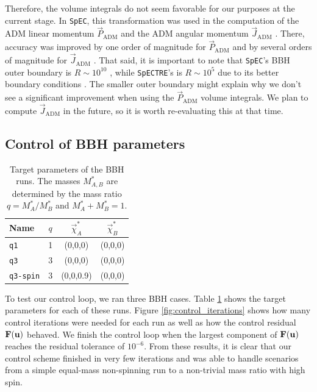 \documentclass{../document}
\begin{document}
      Therefore, the volume integrals do not seem favorable for our purposes at the current stage. In {\tt SpEC}, this transformation was used in the computation of the ADM linear momentum $\vec P_\text{ADM}$ and the ADM angular momentum $\vec J_\text{ADM}$ \cite{Serguei}. There, accuracy was improved by one order of magnitude for $\vec P_\text{ADM}$ and by several orders of magnitude for $\vec J_\text{ADM}$ \cite{Serguei}. That said, it is important to note that {\tt SpEC}'s BBH outer boundary is $R \sim 10^{10}$ \cite{Serguei}, while {\tt SpECTRE}'s is $R \sim 10^5$ due to its better boundary conditions \cite{Vu_2024}. The smaller outer boundary might explain why we don't see a significant improvement when using the $\vec P_\text{ADM}$ volume integrals. We plan to compute $\vec J_\text{ADM}$ in the future, so it is worth re-evaluating this at that time.

    \subsection{Control of BBH parameters}

      \begin{table}
        \centering
        \def\arraystretch{1.5}
		    \setlength{\tabcolsep}{0.5cm}
        \begin{tabular}{lccc}
          \hline
          \hline
          Name & $q$ & $\vec \chi^*_A$ & $\vec \chi^*_B$ \\
          \hline
          {\tt q1} & 1 & (0,0,0) & (0,0,0) \\
          {\tt q3} & 3 & (0,0,0) & (0,0,0) \\
          {\tt q3-spin} & 3 & (0,0,0.9) & (0,0,0) \\
          \hline
          \hline
        \end{tabular}
        \caption{Target parameters of the BBH runs. The masses $M^*_{A,B}$ are determined by the mass ratio $q = M^*_A / M^*_B$ and $M^*_A + M^*_B = 1$.}
        \label{tab:bbh-runs}
      \end{table}

      To test our control loop, we ran three BBH cases. Table \ref{tab:bbh-runs} shows the target parameters for each of these runs. Figure \ref{fig:control_iterations} shows how many control iterations were needed for each run as well as how the control residual ${\bf F}({\bf u})$ behaved. We finish the control loop when the largest component of ${\bf F}({\bf u})$ reaches the residual tolerance of $10^{-6}$. From these results, it is clear that our control scheme finished in very few iterations and was able to handle scenarios from a simple equal-mass non-spinning run to a non-trivial mass ratio with high spin.
\end{document}
